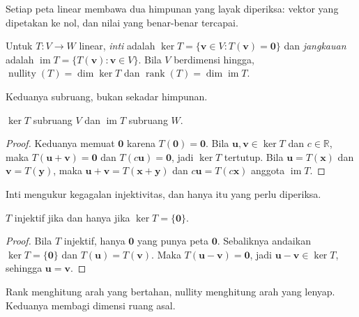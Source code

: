 Setiap peta linear membawa dua himpunan yang layak diperiksa: vektor yang dipetakan ke nol,
dan nilai yang benar-benar tercapai.


\begin{definisi}
Untuk $T\colon V\to W$ linear, \emph{inti} adalah
$\ker T=\{\mathbf{v}\in V: T(\mathbf{v})=\mathbf{0}\}$ dan \emph{jangkauan} adalah
$\operatorname{im}T=\{T(\mathbf{v}):\mathbf{v}\in V\}$. Bila $V$ berdimensi hingga,
$\operatorname{nullity}(T)=\dim\ker T$ dan $\operatorname{rank}(T)=\dim\operatorname{im}T$.
\end{definisi}

Keduanya subruang, bukan sekadar himpunan.

\begin{lemma}
$\ker T$ subruang $V$ dan $\operatorname{im}T$ subruang $W$.
\end{lemma}

\begin{proof}
Keduanya memuat $\mathbf{0}$ karena $T(\mathbf{0})=\mathbf{0}$. Bila
$\mathbf{u},\mathbf{v}\in\ker T$
dan $c\in\mathbb{R}$, maka $T(\mathbf{u}+\mathbf{v})=\mathbf{0}$ dan
$T(c\mathbf{u})=\mathbf{0}$,
jadi $\ker T$ tertutup. Bila $\mathbf{u}=T(\mathbf{x})$ dan $\mathbf{v}=T(\mathbf{y})$, maka
$\mathbf{u}+\mathbf{v}=T(\mathbf{x}+\mathbf{y})$ dan $c\mathbf{u}=T(c\mathbf{x})$ anggota
$\operatorname{im}T$.
\end{proof}

Inti mengukur kegagalan injektivitas, dan hanya itu yang perlu diperiksa.

\begin{proposisi}
$T$ injektif jika dan hanya jika $\ker T=\{\mathbf{0}\}$.
\end{proposisi}

\begin{proof}
Bila $T$ injektif, hanya $\mathbf{0}$ yang punya peta $\mathbf{0}$. Sebaliknya andaikan
$\ker T=\{\mathbf{0}\}$ dan $T(\mathbf{u})=T(\mathbf{v})$. Maka $T(\mathbf{u}-\mathbf{v})=\mathbf{0}$,
jadi $\mathbf{u}-\mathbf{v}\in\ker T$, sehingga $\mathbf{u}=\mathbf{v}$.
\end{proof}

Rank menghitung arah yang bertahan, nullity menghitung arah yang lenyap. Keduanya membagi
dimensi ruang asal.


